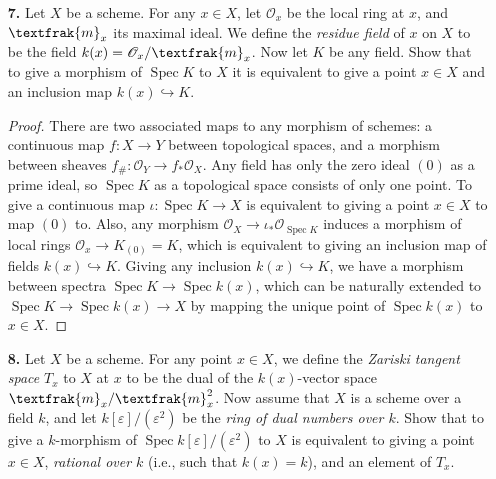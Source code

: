 \documentclass{article}
\newcommand{\goth}[1]{\textfrak{#1}}
\newcommand{\fO}{\mathscr{O}}
\DeclareMathOperator{\spec}{Spec}
\begin{document}
\begin{enumerate} [label=\textbf{\arabic*.}, leftmargin=0em]
\item[\textbf{7.}] Let $X$ be a scheme. For any $x \in X$, let $\fO_x$ be the local ring at $x$, and $\goth{m}_x$ its maximal ideal. We define the \textit{residue field} of $x$ on $X$ to be the field $k(x) = \fO_x / \goth{m}_x$. Now let $K$ be any field. Show that to give a morphism of $\spec{K}$ to $X$ it is equivalent to give a point $x \in X$ and an inclusion map $k(x) \hookrightarrow K$.

\begin{proof}
    There are two associated maps to any morphism of schemes: a continuous map $f: X \to Y$ between topological spaces, and a morphism between sheaves $f_\# : \fO_Y \to f_* \fO_X$. Any field has only the zero ideal $(0)$ as a prime ideal, so $\spec{K}$ as a topological space consists of only one point. To give a continuous map $\iota : \spec{K} \to X$ is equivalent to giving a point $x \in X$ to map $(0)$ to. Also, any morphism $\fO_X \to \iota_* \fO_{\spec{K}}$ induces a morphism of local rings $\fO_x \to K_{(0)} = K$, which is equivalent to giving an inclusion map of fields $k(x) \hookrightarrow K$. Giving any inclusion $k(x) \hookrightarrow K$, we have a morphism between spectra $\spec{K} \to \spec{k(x)}$, which can be naturally extended to $\spec{K} \to \spec{k(x)} \to X$ by mapping the unique point of $\spec{k(x)}$ to $x \in X$.
\end{proof}

\item[\textbf{8.}] Let $X$ be a scheme. For any point $x \in X$, we define the \textit{Zariski tangent space} $T_x$ to $X$ at $x$ to be the dual of the $k(x)$-vector space $\goth{m}_x / \goth{m}_x^2$. Now assume that $X$ is a scheme over a field $k$, and let $k[\varepsilon] / (\varepsilon^2)$ be the \textit{ring of dual numbers over $k$}. Show that to give a $k$-morphism of $\spec{k[\varepsilon] / (\varepsilon^2)}$ to $X$ is equivalent to giving a point $x \in X$, \textit{rational over $k$} (i.e., such that $k(x) = k$), and an element of $T_x$.


\end{enumerate}
\end{document}
